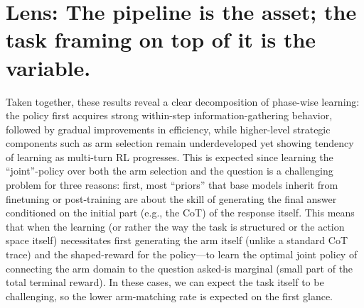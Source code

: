 \documentclass[11pt]{article}
\theoremstyle{plain}
\theoremstyle{definition}
\theoremstyle{remark}
\begin{document}


\iffalse
\section{Lens: The pipeline is the asset; the task framing on top of it is the variable.}
Taken together, these results reveal a clear decomposition of phase-wise learning: the policy first acquires strong within-step information-gathering behavior, followed by gradual improvements in efficiency, while higher-level strategic components such as arm selection remain underdeveloped yet showing tendency of learning as multi-turn RL progresses. This is expected since learning the “joint”-policy over both the arm selection and the question is a challenging problem for three reasons: first, most “priors” that base models inherit from finetuning or post-training are about the skill of generating the final answer conditioned on the initial part (e.g., the CoT) of the response itself. This means that when the learning (or rather the way the task is structured or the action space itself) necessitates first generating the arm itself (unlike a standard CoT trace) and the shaped-reward for the policy—to learn the optimal joint policy of connecting the arm domain to the question asked-is marginal (small part of the total terminal reward). In these cases, we can expect the task itself to be challenging, so the lower arm-matching rate is expected on the first glance. 
\end{document}
